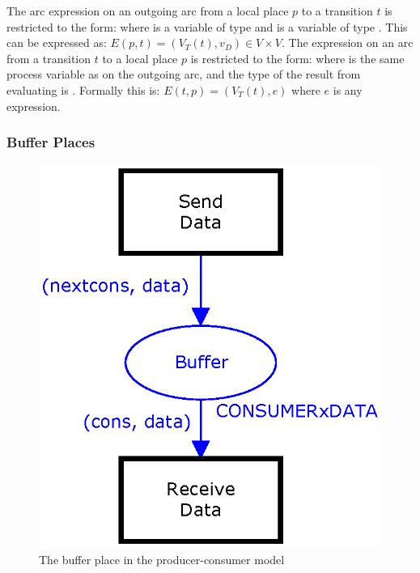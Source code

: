 \noindent
The arc expression on an outgoing arc from a local place $p$ to a transition $t$ is restricted to the form:  where  is a variable of type  and  is a variable of type . This can be expressed as: $E(p, t) = (V_{T}(t), v_{D}) \in V \times V$. The expression on an arc from a transition $t$ to a local place $p$ is restricted to the form:  where  is the same process variable as on the outgoing arc, and the type of the result from evaluating  is . Formally this is: $E(t, p) = (V_{T}(t), e)$ where $e$ is any expression.


\subsubsection{Buffer Places}

\begin{figure}[b!]
\centering
\includegraphics[scale=0.45]{netclass/graphics/buffer_place.eps}
\caption{The buffer place  in the producer-consumer model}
\label{fig:bufferplace}
\end{figure}


